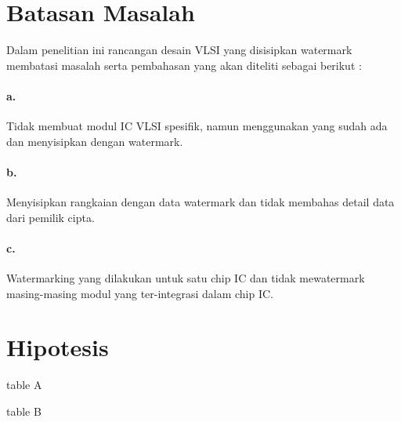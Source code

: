 \section{Batasan Masalah}
Dalam penelitian ini rancangan desain VLSI yang disisipkan watermark membatasi masalah serta pembahasan yang akan diteliti sebagai berikut :
\paragraph{a.} Tidak membuat modul IC VLSI spesifik, namun menggunakan yang sudah ada dan menyisipkan dengan watermark.
\paragraph{b.} Menyisipkan rangkaian dengan data watermark dan tidak membahas detail data dari pemilik cipta.
\paragraph{c.} Watermarking yang dilakukan untuk satu chip IC dan tidak mewatermark masing-masing modul yang ter-integrasi dalam chip IC.

\section{Hipotesis}
\blindtext[1]
\begin{table}
	\caption{table A}
\end{table}
\begin{table}
	\caption{table B}
\end{table}